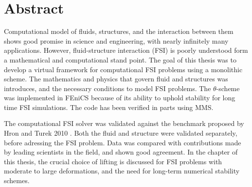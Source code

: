 \section*{Abstract}
Computational model of fluids, structures, and the interaction between them shows good promise in science and engineering, with nearly infinitely many applications. However, fluid-structure interaction (FSI) is poorly understood form a mathematical and computational stand point. The goal of this thesis was to develop a virtual framework for computational FSI problems using a monolithic scheme. The mathematics and physics that govern fluid and structures was introduces, and the necessary conditions to model FSI problems. The $\theta$-scheme was implemented in FEniCS because of its ability to uphold stability for long time FSI simulations. The code has been verified in parts using MMS.\newline

The computational FSI solver was validated against the benchmark proposed by Hron and Turek 2010 \cite{Hron2006a}. Both the fluid and structure were validated separately, before adressing the FSI problem. Data was compared with contributions made by leading scientists in the field, and shown good agreement. In the  chapter of this thesis, the crucial choice of lifting is discussed for FSI problems with moderate to large deformations, and the need for long-term numerical stability schemes.



